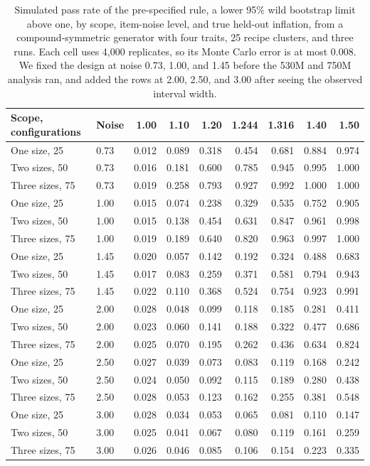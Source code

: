 \begin{table}[!htb]
\centering
\caption{Simulated pass rate of the pre-specified rule, a lower 95\% wild bootstrap limit above one, by scope, item-noise level, and true held-out inflation, from a compound-symmetric generator with four traits, 25 recipe clusters, and three runs. Each cell uses 4,000 replicates, so its Monte Carlo error is at most 0.008. We fixed the design at noise 0.73, 1.00, and 1.45 before the 530M and 750M analysis ran, and added the rows at 2.00, 2.50, and 3.00 after seeing the observed interval width.}
\label{tab:rulepower}
\small\setlength{\tabcolsep}{4pt}\renewcommand{\arraystretch}{1.12}
\begin{tabular}{llrrrrrrr}
\toprule
Scope, configurations & Noise & 1.00 & 1.10 & 1.20 & 1.244 & 1.316 & 1.40 & 1.50\\
\midrule
One size, 25 & 0.73 & 0.012 & 0.089 & 0.318 & 0.454 & 0.681 & 0.884 & 0.974\\
Two sizes, 50 & 0.73 & 0.016 & 0.181 & 0.600 & 0.785 & 0.945 & 0.995 & 1.000\\
Three sizes, 75 & 0.73 & 0.019 & 0.258 & 0.793 & 0.927 & 0.992 & 1.000 & 1.000\\
One size, 25 & 1.00 & 0.015 & 0.074 & 0.238 & 0.329 & 0.535 & 0.752 & 0.905\\
Two sizes, 50 & 1.00 & 0.015 & 0.138 & 0.454 & 0.631 & 0.847 & 0.961 & 0.998\\
Three sizes, 75 & 1.00 & 0.019 & 0.189 & 0.640 & 0.820 & 0.963 & 0.997 & 1.000\\
One size, 25 & 1.45 & 0.020 & 0.057 & 0.142 & 0.192 & 0.324 & 0.488 & 0.683\\
Two sizes, 50 & 1.45 & 0.017 & 0.083 & 0.259 & 0.371 & 0.581 & 0.794 & 0.943\\
Three sizes, 75 & 1.45 & 0.022 & 0.110 & 0.368 & 0.524 & 0.754 & 0.923 & 0.991\\
\midrule
One size, 25 & 2.00 & 0.028 & 0.048 & 0.099 & 0.118 & 0.185 & 0.281 & 0.411\\
Two sizes, 50 & 2.00 & 0.023 & 0.060 & 0.141 & 0.188 & 0.322 & 0.477 & 0.686\\
Three sizes, 75 & 2.00 & 0.025 & 0.070 & 0.195 & 0.262 & 0.436 & 0.634 & 0.824\\
One size, 25 & 2.50 & 0.027 & 0.039 & 0.073 & 0.083 & 0.119 & 0.168 & 0.242\\
Two sizes, 50 & 2.50 & 0.024 & 0.050 & 0.092 & 0.115 & 0.189 & 0.280 & 0.438\\
Three sizes, 75 & 2.50 & 0.028 & 0.053 & 0.123 & 0.162 & 0.255 & 0.381 & 0.548\\
One size, 25 & 3.00 & 0.028 & 0.034 & 0.053 & 0.065 & 0.081 & 0.110 & 0.147\\
Two sizes, 50 & 3.00 & 0.025 & 0.041 & 0.067 & 0.080 & 0.119 & 0.161 & 0.259\\
Three sizes, 75 & 3.00 & 0.026 & 0.046 & 0.085 & 0.106 & 0.154 & 0.223 & 0.335\\
\bottomrule
\end{tabular}
\end{table}

